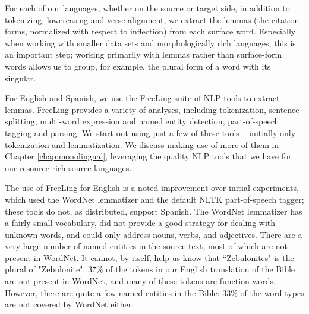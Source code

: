 For each of our languages, whether on the source or target side, in addition to
tokenizing, lowercasing and verse-alignment, we extract the lemmas (the
citation forms, normalized with respect to inflection) from each surface word.
Especially when working with smaller data sets and morphologically rich
languages, this is an important step; working primarily with lemmas rather than
surface-form words allows us to group, for example, the plural form of a word
with its singular.

For English and Spanish, we use the FreeLing suite of NLP tools
\cite{padro12} to extract lemmas. FreeLing provides a variety of analyses,
including tokenization, sentence splitting, multi-word expression and named
entity detection, part-of-speech tagging and parsing.  We start out using just
a few of these tools -- initially only tokenization and lemmatization. We
discuss making use of more of them in Chapter \ref{chap:monolingual},
leveraging the quality NLP tools that we have for our resource-rich source
languages.

The use of FreeLing for English is a noted improvement over initial
experiments, which used the WordNet lemmatizer and the default NLTK
part-of-speech tagger; these tools do not, as distributed, support Spanish.
The WordNet lemmatizer has a fairly small vocabulary, did not
provide a good strategy for dealing with unknown words, and could only address
nouns, verbs, and adjectives.
There are a very large number of named entities in the source text, most of
which are not present in WordNet. It cannot, by itself, help us know that
``Zebulonites" is the plural of "Zebulonite".  37\% of the tokens in our
English translation of the Bible are not present in WordNet, and many of these
tokens are function words. However, there are quite a few named entities in the
Bible: 33\% of the word types are not covered by WordNet either.

